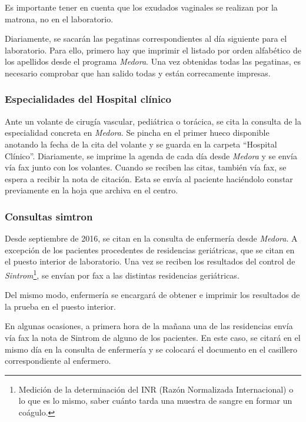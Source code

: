 Es importante tener en cuenta que los exudados vaginales se realizan por la matrona, no en el laboratorio.

Diariamente, se sacarán las pegatinas correspondientes al día siguiente para el laboratorio. Para ello, primero hay que imprimir el listado por orden alfabético de los apellidos desde el programa \textit{Medora}. Una vez obtenidas todas las pegatinas, es necesario comprobar que han salido todas y están correcamente impresas.

\subsubsection{Especialidades del Hospital clínico}

Ante un volante de cirugía vascular, pediátrica o torácica, se cita la consulta de la especialidad concreta en \textit{Medora}.
Se pincha en el primer hueco disponible anotando la fecha de la cita del volante y se guarda en la carpeta ``Hospital Clínico''.
Diariamente, se imprime la agenda de cada día desde \textit{Medora} y se envía vía fax junto con los volantes.
Cuando se reciben las citas, también vía fax, se espera a recibir la nota de citación.
Esta se envía al paciente haciéndolo constar previamente en la hoja que archiva en el centro.

\subsubsection{Consultas simtron}

Desde septiembre de 2016, se citan en la consulta de enfermería desde \textit{Medora}.
A excepción de los pacientes procedentes de residencias geriátricas, que se citan en el puesto interior de laboratorio.
Una vez se reciben los resultados del control de \textit{Sintrom}\footnote{Medición de la determinación del INR (Razón Normalizada Internacional) o lo que es lo mismo, saber cuánto tarda una muestra de sangre en formar un coágulo.}, se envían por fax a las distintas residencias geriátricas.

Del mismo modo, enfermería se encargará de obtener e imprimir los resultados de la prueba en el puesto interior.

En algunas ocasiones, a primera hora de la mañana una de las residencias envía vía fax la nota de Sintrom de alguno de los pacientes.
En este caso, se citará en el mismo día en la consulta de enfermería y se colocará el documento en el casillero correspondiente al enfermero.

